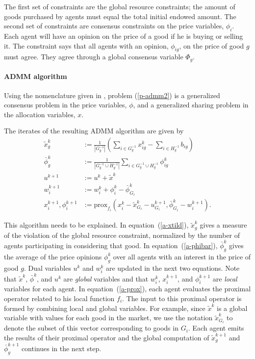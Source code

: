 \documentclass[12pt]{article}
\begin{document}
The first set of constraints are the global resource constraints; the amount of
goods purchased by agents must equal the total initial endowed amount. The
second set of constraints are consensus constraints on the price variables,
$\phi_i$. Each agent will have an opinion on the price of a good if he is
buying or selling it. The constraint says that all agents with an opinion,
$\phi_{ig}$, on the price of good $g$ must agree. They agree through a global
consensus variable $\Phi_g$.


\paragraph{ADMM algorithm}

Using the nomenclature given in \cite{boyd2011distributed}, problem
(\ref{p-admm2}) is a generalized consensus problem in the price variables,
$\phi$, and a generalized sharing problem in the allocation variables, $x$.

The iterates of the resulting ADMM algorithm are given by
\begin{align}
\label{a-xtild}
\tilde{x}^k_g &:= \frac{1}{|G^{-1}_g|} \left( \sum_{i \in G^{-1}_g} x^k_{ig} - \sum_{i \in H^{-1}_g} b_{ig}\right)\\
\label{a-phibar}
\bar{\phi}^k_g &:= \frac{1}{ |G^{-1}_g \cup H^{-1}_g| } \sum_{i \in G^{-1}_g \cup H^{-1}_g}\phi^k_{ig}\\
u^{k+1} &:= u^k + \tilde{x}^k\\
w_i^{k+1} &:= w_i^k + \phi^k_i - \bar{\phi}^k_{G_i}\\
\label{a-prox}
x_i^{k+1}, \phi_i^{k+1} &:= \mbox{prox}_{f_i}(x_i^k - \tilde{x}^k_{G_i} - u^{k+1}_{G_i},
\bar{\phi}^k_{G_i} - w_i^{k+1}).
\end{align}

This algorithm needs to be explained. In equation~(\ref{a-xtild}),
$\tilde{x}^k_g$ gives a measure of the violation of the global resource
constraint, normalized by the number of agents participating in considering
that good. In equation~(\ref{a-phibar}), $\bar{\phi}^k_g$ gives the average of
the price opinions $\phi^k_g$ over all agents with an interest in the price of
good $g$. Dual variables $u^k$ and $w^k_i$ are updated in the next two
equations. Note that $\tilde{x}^k$, $\bar{\phi}^k$, and $u^k$ are \emph{global}
variables and that $w_i^k$, $x_i^{k+1}$, and $\phi_i^{k+1}$ are \emph{local}
variables for each agent. In equation~(\ref{a-prox}), each agent evaluates the
proximal operator related to his local function $f_i$. The input to this
proximal operator is formed by combining local and global variables. For
example, since $\tilde{x}^k$ is a global variable with values for each good in
the market, we use the notation $\tilde{x}^k_{G_i}$ to denote the subset of
this vector corresponding to goods in $G_i$. Each agent emits the results of
their proximal operator and the global computation of $\tilde{x}^{k+1}_g$ and
$\bar{\phi}^{k+1}_g$ continues in the next step.
\end{document}
